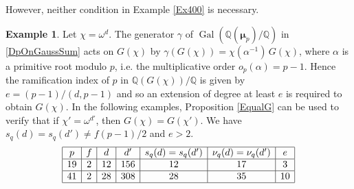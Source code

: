 \documentclass[12pt]{amsart}  \usepackage{amsmath,amssymb,enumerate,amscd,tikz,url}
\numberwithin{equation}{section}
\theoremstyle{definition}
\newtheorem{Ex}[equation]{Example}
\newcommand{\Q}{{\mathbb Q}}
\newcommand{\Mu}{\boldsymbol \mu}
\newcommand{\Gal}{\operatorname{Gal}}
\begin{document}
However, neither condition in Example \ref{Ex400} is necessary.

\begin{Ex} \label{Ex500}
Let $\chi  = \omega^d$.  The generator $\gamma$ of $\Gal(\Q(\Mu_{p})/\Q)$ in \eqref{DpOnGaussSum} acts on $G(\chi)$ by $\gamma(G(\chi)) = \chi(\alpha^{-1}) \, G(\chi)$, where $\alpha$ is a primitive root modulo $p$, i.e. the multiplicative order $o_p(\alpha)  = p-1$.  Hence the ramification index of $p$ in $\Q(G(\chi))/\Q$ is given by $e = (p-1)/(d,p-1)$ and so an extension of degree at least $e$ is required to obtain $G(\chi)$.  In the following examples, Proposition \ref{EqualG} can be used to verify that if $\chi' = \omega^{d'}$, then $G(\chi) = G(\chi')$.  We have $s_q(d) = s_q(d') \ne f(p-1)/2$ and $e > 2$.
$$
\begin{array}{| c | c | c | c | c | c | c |}
\hline
p & f & d &  d' & s_q(d) = s_q(d') & \nu_q(d) = \nu_q(d')  &   e \\
\hline
19 & 2 & 12 & 156 & 12 & 17 & 3 \\ 
\hline
41 & 2 & 28 & 308 &  28 & 35 &10 \\
\hline
\end{array}
$$
\end{Ex}
\end{document}
